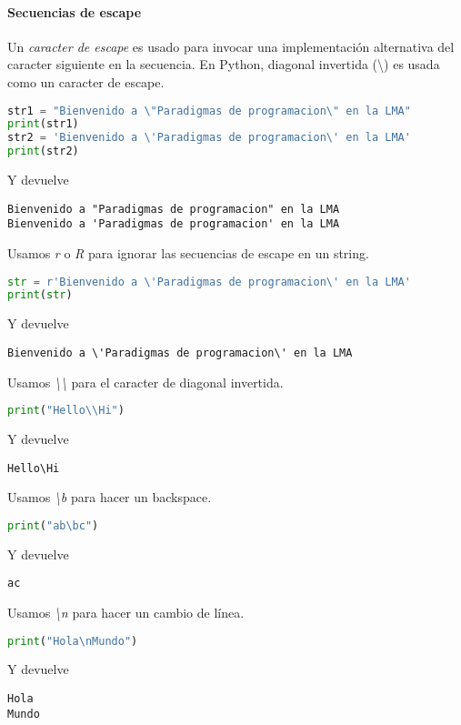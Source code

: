     \paragraph{Secuencias de escape} Un \emph{caracter de escape} es usado para invocar una implementación alternativa del caracter siguiente en la secuencia. En Python, diagonal invertida (\textbackslash) es usada como un caracter de escape. 
    \begin{lstlisting}[language = {python}]
str1 = "Bienvenido a \"Paradigmas de programacion\" en la LMA"
print(str1)
str2 = 'Bienvenido a \'Paradigmas de programacion\' en la LMA'
print(str2)
    \end{lstlisting}
    Y devuelve
    \begin{lstlisting}[language = {[latex]tex}]
Bienvenido a "Paradigmas de programacion" en la LMA
Bienvenido a 'Paradigmas de programacion' en la LMA
    \end{lstlisting}
    Usamos \emph{r} o \emph{R} para ignorar las secuencias de escape en un string.
    \begin{lstlisting}[language = {python}]
str = r'Bienvenido a \'Paradigmas de programacion\' en la LMA'
print(str)
    \end{lstlisting}
    Y devuelve
    \begin{lstlisting}[language = {[latex]tex}]
Bienvenido a \'Paradigmas de programacion\' en la LMA
    \end{lstlisting}
    Usamos \emph{\textbackslash\textbackslash} para el caracter de diagonal invertida.
    \begin{lstlisting}[language = {python}]
print("Hello\\Hi")
    \end{lstlisting}
    Y devuelve
    \begin{lstlisting}[language = {[latex]tex}]
Hello\Hi
    \end{lstlisting}
    Usamos \emph{\textbackslash b} para hacer un backspace.
    \begin{lstlisting}[language = {python}]
print("ab\bc")
    \end{lstlisting}
    Y devuelve
    \begin{lstlisting}[language = {[latex]tex}]
ac
    \end{lstlisting}
    Usamos \emph{\textbackslash n} para hacer un cambio de línea.
    \begin{lstlisting}[language = {python}]
print("Hola\nMundo")
    \end{lstlisting}
    Y devuelve
    \begin{lstlisting}[language = {[latex]tex}]
Hola
Mundo
    \end{lstlisting}
